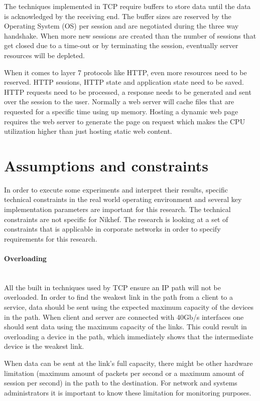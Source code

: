 The techniques implemented in TCP require buffers to store data until the data is acknowledged by the receiving end.
The buffer sizes are reserved by the Operating System (OS) per session and are negotiated during the three way handshake.  
When more new sessions are created than the number of sessions that get closed due to a time-out or by terminating the session, eventually server resources will be depleted.

When it comes to layer 7 protocols like HTTP, even more resources need to be reserved. HTTP sessions, HTTP state and application state need to be saved. 
HTTP requests need to be processed, a response needs to be generated and sent over the session to the user. Normally a web server will cache files that are requested for a specific time using up memory. Hosting a dynamic web page requires the web server to generate the page on request which makes the CPU utilization higher than just hosting static web content. 

\section{Assumptions and constraints}\label{sec:specifications}
In order to execute some experiments and interpret their results, specific technical constraints in the real world operating environment and several key implementation parameters are important for this research. The technical constraints are not specific for Nikhef. The research is looking at a set of constraints that is applicable in corporate networks in order to specify requirements for this research.

\paragraph{Overloading}\label{par:overload}\mbox{}\\
All the built in techniques used by TCP ensure an IP path will not be overloaded. 
In order to find the weakest link in the path from a client to a service, data should be sent using the expected maximum capacity of the devices in the path.
When client and server are connected with 40Gb/s interfaces one should sent data using the maximum capacity of the links.
This could result in overloading a device in the path, which immediately shows that the intermediate device is the weakest link.

When data can be sent at the link's full capacity, there might be other hardware limitation (maximum amount of packets per second or a maximum amount of session per second) in the path to the destination.
For network and systems administrators it is important to know these limitation for monitoring purposes.

